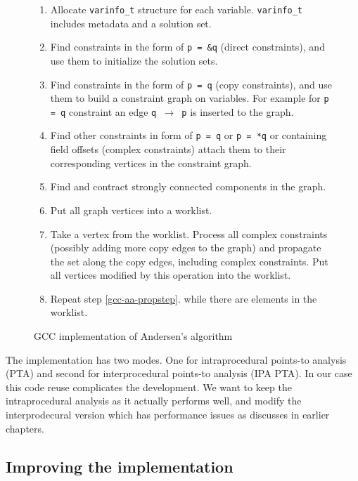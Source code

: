 \begin{figure}[!ht]
\begin{tcolorbox}
\begin{enumerate}
	\item Allocate {\tt varinfo\_t} structure for each variable. {\tt varinfo\_t} includes
		metadata and a solution set.
	\item Find constraints in the form of {\tt p = \&q} (direct constraints), and
		use them to initialize the solution sets.
	\item Find constraints in the form of {\tt p = q} (copy constraints), and use
		them to build a constraint graph on variables. For example for {\tt p =
		q} constraint an edge {\tt q $\to$ p} is inserted to the graph.
	\item Find other constraints in form of {\tt *p = q} or {\tt p = *q} or
		containing field offsets (complex constraints) attach them to their
		corresponding vertices in the constraint graph.
	\item Find and contract strongly connected components in the graph.
	\item Put all graph vertices into a worklist.
	\item Take a vertex from the worklist. Process all complex constraints
		(possibly adding more copy edges to the graph) and propagate the set
		along the copy edges, including complex constraints. Put all vertices
		modified by this operation into the worklist.
	\label{gcc-aa-propstep}
	\item Repeat step \ref{gcc-aa-propstep}. while there are elements in the worklist.
\end{enumerate}
\end{tcolorbox}
\caption{GCC implementation of Andersen's algorithm}
\label{figure-gcc-aliasalg}
\end{figure}

The implementation has two modes. One for intraprocedural points-to analysis
(PTA) and second for interprocedural points-to analysis (IPA PTA). In our case
this code reuse complicates the development. We want to keep the
intraprocedural analysis as it actually performs well, and modify the
interprodecural version which has performance issues as discusses in earlier
chapters.

\subsection{Improving the implementation}

